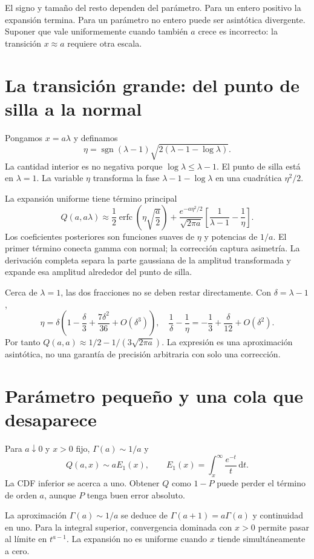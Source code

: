 \documentclass[11pt,a4paper]{article}
\newcommand{\dd}{\,\mathrm d}
\theoremstyle{definition}
\DeclareMathOperator{\erfc}{erfc}
\DeclareMathOperator{\sgn}{sgn}
\begin{document}
El signo y tamaño del resto dependen del parámetro. Para un entero positivo la expansión termina. Para un parámetro no entero puede ser asintótica divergente. Suponer que vale uniformemente cuando también $a$ crece es incorrecto: la transición $x\approx a$ requiere otra escala.

\section{La transición grande: del punto de silla a la normal}
Pongamos $x=a\lambda$ y definamos
\[
\eta=\sgn(\lambda-1)\sqrt{2(\lambda-1-\log\lambda)}.
\]
La cantidad interior es no negativa porque $\log\lambda\le\lambda-1$. El punto de silla está en $\lambda=1$. La variable $\eta$ transforma la fase
$\lambda-1-\log\lambda$ en una cuadrática $\eta^2/2$.

La expansión uniforme tiene término principal
\[
Q(a,a\lambda)\approx\frac12\erfc\left(\eta\sqrt{\frac a2}\right)
+\frac{e^{-a\eta^2/2}}{\sqrt{2\pi a}}
\left[\frac1{\lambda-1}-\frac1\eta\right].
\]
Los coeficientes posteriores son funciones suaves de $\eta$ y potencias de $1/a$. El primer término conecta gamma con normal; la corrección captura asimetría. La derivación completa separa la parte gaussiana de la amplitud transformada y expande esa amplitud alrededor del punto de silla.

Cerca de $\lambda=1$, las dos fracciones no se deben restar directamente. Con $\delta=\lambda-1$,
\[
\eta=\delta\left(1-\frac\delta3+\frac{7\delta^2}{36}+O(\delta^3)\right),
\quad
\frac1\delta-\frac1\eta=-\frac13+\frac\delta{12}+O(\delta^2).
\]
Por tanto $Q(a,a)\approx1/2-1/(3\sqrt{2\pi a})$. La expresión es una aproximación asintótica, no una garantía de precisión arbitraria con solo una corrección.

\section{Parámetro pequeño y una cola que desaparece}
Para $a\downarrow0$ y $x>0$ fijo, $\Gamma(a)\sim1/a$ y
\[
Q(a,x)\sim aE_1(x),\qquad
E_1(x)=\int_x^\infty\frac{e^{-t}}t\dd t.
\]
La CDF inferior se acerca a uno. Obtener $Q$ como $1-P$ puede perder el término de orden $a$, aunque $P$ tenga buen error absoluto.

La aproximación $\Gamma(a)\sim1/a$ se deduce de $\Gamma(a+1)=a\Gamma(a)$ y continuidad en uno. Para la integral superior, convergencia dominada con $x>0$ permite pasar al límite en $t^{a-1}$. La expansión no es uniforme cuando $x$ tiende simultáneamente a cero.
\end{document}
